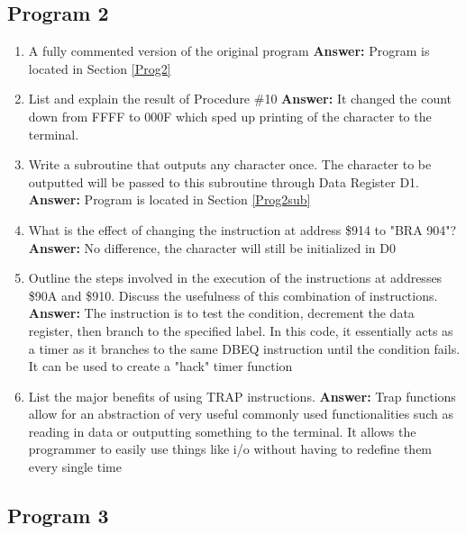 \documentclass[12pt, twocolumn]{article}
\begin{document}
\subsection{Program 2}
\begin{enumerate}
	\item A fully commented version of the original program
	\subitem \hspace{-0.7cm}\textbf{Answer:} Program is located in Section \ref{Prog2}
	\item List and explain the result of Procedure \#10
	\subitem \hspace{-0.7cm}\textbf{Answer:} It changed the count down from FFFF to 000F which sped up printing of the character to the terminal. 
	\item Write a subroutine that outputs any character once. The character to be outputted will be passed to this subroutine through Data Register D1.
	\subitem \hspace{-0.7cm}\textbf{Answer:} Program is located in Section \ref{Prog2sub}
	\item What is the effect of changing the instruction at address \$914 to "BRA 904"?
	\subitem \hspace{-0.7cm}\textbf{Answer:} No difference, the character will still be initialized in D0
	\item Outline the steps involved in the execution of the instructions at addresses \$90A and \$910. Discuss the usefulness of this combination of instructions.
	\subitem \hspace{-0.7cm}\textbf{Answer:} The instruction is to test the condition, decrement the data register, then branch to the specified label. In this code, it essentially acts as a timer as it branches to the same DBEQ instruction until the condition fails. It can be used to create a "hack" timer function
	\item List the major benefits of using TRAP instructions.
	\subitem \hspace{-0.7cm}\textbf{Answer:} Trap functions allow for an abstraction of very useful commonly used functionalities such as reading in data or outputting something to the terminal. It allows the programmer to easily use things like i/o without having to redefine them every single time
\end{enumerate}
\subsection{Program 3}
\end{document}
